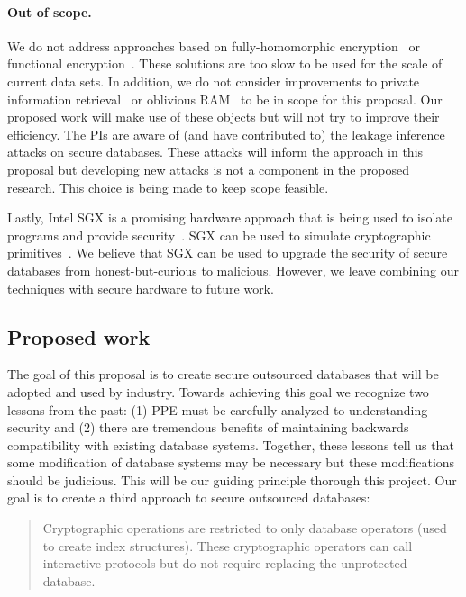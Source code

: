 \paragraph{Out of scope.} We do not address approaches based on fully-homomorphic encryption~\cite{STOC:Gentry09} or functional encryption~\cite{FOCS:GGHRSW13}.  These solutions are too slow to be used for the scale of current data sets.  In addition, we do not consider improvements to private information retrieval~\cite{FOCS:CGKS95} or oblivious RAM~\cite{STOC:Goldreich87,goldreich1996software} to be in scope for this proposal.  Our proposed work will make use of these objects but will not try to improve their efficiency.  The PIs are aware of (and have contributed to) the leakage inference attacks on secure databases.  These attacks will inform the approach in this proposal but developing new attacks is not a component in the proposed research.  This choice is being made to keep scope feasible.

Lastly, Intel SGX is a promising hardware approach that is being used to isolate programs and provide security~\cite{EPRINT:CosDev16}.  SGX can be used to simulate cryptographic primitives~\cite{EPRINT:SasGorFle17,EPRINT:FVBG16}.  We believe that SGX can be used to upgrade the security of secure databases from honest-but-curious to malicious.  However, we leave combining our techniques with secure hardware to future work.


\subsection{Proposed work}
The goal of this proposal is to create secure outsourced databases that
will be adopted and used by industry.  Towards achieving this goal we
recognize two lessons from the past: (1) PPE must be carefully analyzed
to understanding security and (2) there are tremendous benefits of
maintaining backwards compatibility with existing database systems.
Together, these lessons tell us that some modification of database
systems may be necessary but these modifications should be judicious.
This will be our guiding principle thorough this project.  Our goal is to create a third approach to secure outsourced databases: 
\begin{quote}Cryptographic operations are restricted to only database operators (used to create index structures).  These cryptographic operators can call interactive protocols but do not require replacing the unprotected database. 
\end{quote}

